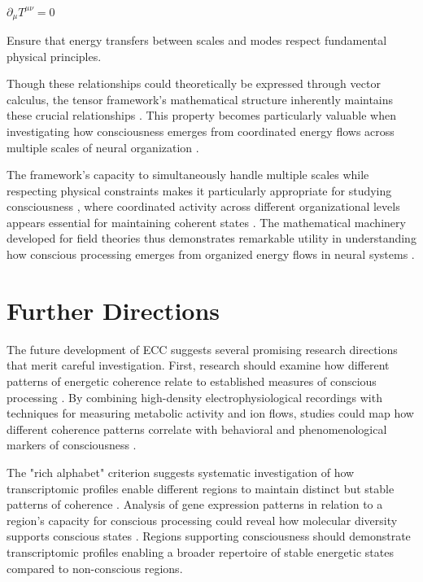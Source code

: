 \begin{refsection}
$\partial_\mu T^{\mu\nu} = 0$

Ensure that energy transfers between scales and modes respect fundamental physical principles.

Though these relationships could theoretically be expressed through vector calculus, the tensor framework's mathematical structure inherently maintains these crucial relationships \cite{rosen2012anticipatory, varela2016embodied}. This property becomes particularly valuable when investigating how consciousness emerges from coordinated energy flows across multiple scales of neural organization \cite{koch2019feeling}.

The framework's capacity to simultaneously handle multiple scales while respecting physical constraints makes it particularly appropriate for studying consciousness \cite{thompson2014waking}, where coordinated activity across different organizational levels appears essential for maintaining coherent states \cite{feinberg2016ancient}. The mathematical machinery developed for field theories thus demonstrates remarkable utility in understanding how conscious processing emerges from organized energy flows in neural systems \cite{deacon2011incomplete, rovelli2018order}.

\section{Further Directions}

The future development of ECC suggests several promising research directions that merit careful investigation. First, research should examine how different patterns of energetic coherence relate to established measures of conscious processing \cite{seth2021being}. By combining high-density electrophysiological recordings with techniques for measuring metabolic activity and ion flows, studies could map how different coherence patterns correlate with behavioral and phenomenological markers of consciousness \cite{thompson2014waking}.

The "rich alphabet" criterion suggests systematic investigation of how transcriptomic profiles enable different regions to maintain distinct but stable patterns of coherence \cite{koch2019feeling}. Analysis of gene expression patterns in relation to a region's capacity for conscious processing could reveal how molecular diversity supports conscious states \cite{feinberg2016ancient}. Regions supporting consciousness should demonstrate transcriptomic profiles enabling a broader repertoire of stable energetic states compared to non-conscious regions.


\end{refsection}
